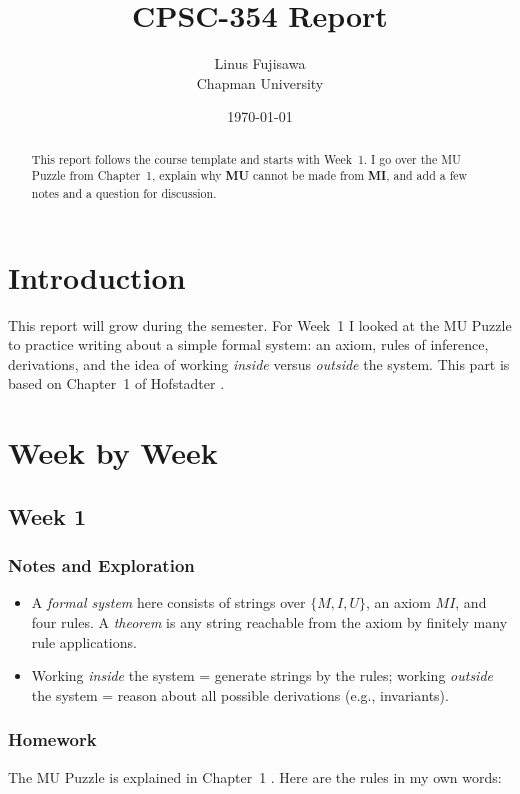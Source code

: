 \documentclass{article}
\title{CPSC-354 Report}
\author{Linus Fujisawa \\ Chapman University}
\date{\today}
\theoremstyle{theorem}
\theoremstyle{definition}
\theoremstyle{remark}
\begin{document}
\maketitle

\begin{abstract}
This report follows the course template and starts with Week~1. I go over the MU Puzzle from Chapter~1, explain why \textbf{MU} cannot be made from \textbf{MI}, and add a few notes and a question for discussion.
\end{abstract}

\setcounter{tocdepth}{3}
\tableofcontents

\section{Introduction}\label{intro}
This report will grow during the semester. For Week~1 I looked at the MU Puzzle to practice writing about a simple formal system: an axiom, rules of inference, derivations, and the idea of working \emph{inside} versus \emph{outside} the system. This part is based on Chapter~1 of Hofstadter \cite{heb}.

\section{Week by Week}\label{homework}

\subsection{Week 1}

\subsubsection{Notes and Exploration}
\begin{itemize}
  \item A \emph{formal system} here consists of strings over $\{M,I,U\}$, an axiom $MI$, and four rules. A \emph{theorem} is any string reachable from the axiom by finitely many rule applications.
  \item Working \emph{inside} the system = generate strings by the rules; working \emph{outside} the system = reason about all possible derivations (e.g., invariants).
\end{itemize}

\subsubsection{Homework}
The MU Puzzle is explained in Chapter~1 \cite{heb}. Here are the rules in my own words:
\end{document}
